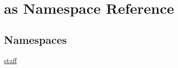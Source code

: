 \hypertarget{namespaceas}{}\section{as Namespace Reference}
\label{namespaceas}
\subsection*{Namespaces}
\begin{DoxyCompactItemize}
\item 
 \hyperlink{namespaceas_1_1staff}{staff}
\end{DoxyCompactItemize}
